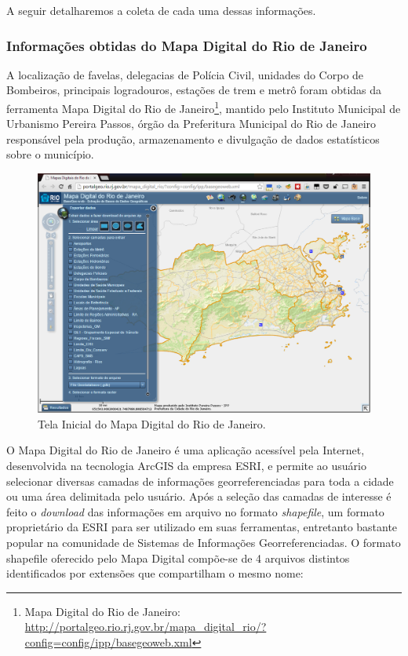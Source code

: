 A seguir detalharemos a coleta de cada uma dessas informações.



\subsubsection{Informações obtidas do Mapa Digital do Rio de Janeiro}

A localização de favelas, delegacias de Polícia Civil, unidades do Corpo de Bombeiros, principais logradouros, estações de trem e metrô foram obtidas da ferramenta Mapa Digital do Rio de Janeiro\footnote{Mapa Digital do Rio de Janeiro: \url{http://portalgeo.rio.rj.gov.br/mapa_digital_rio/?config=config/ipp/basegeoweb.xml}}, mantido pelo Instituto Municipal de Urbanismo Pereira Passos, órgão da  Preferitura Municipal do Rio de Janeiro responsável pela produção, armazenamento e divulgação de dados estatísticos sobre o município. 

\begin{figure}[h!]
\centering
\includegraphics[width=1\linewidth]{img/tela_mapa_digital_rio}
\caption{Tela Inicial do Mapa Digital do Rio de Janeiro.}
\label{fig:tela_mapa_digital}
\end{figure}


O Mapa Digital do Rio de Janeiro é uma aplicação acessível pela Internet, desenvolvida na tecnologia ArcGIS da empresa ESRI, e permite ao usuário selecionar diversas camadas de informações georreferenciadas para toda a cidade ou uma área delimitada pelo usuário. Após a seleção das camadas de interesse é feito o \textit{download} das informações em arquivo no formato \textit{shapefile}, um formato proprietário da ESRI para ser utilizado em suas ferramentas, entretanto bastante popular na comunidade de Sistemas de Informações Georreferenciadas. O formato shapefile oferecido pelo Mapa Digital compõe-se de 4 arquivos distintos identificados por extensões que compartilham o mesmo nome:

